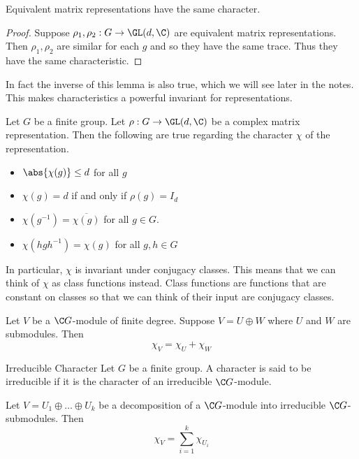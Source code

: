 \documentclass[a4paper]{article}
\begin{document}
\begin{lmm}{}{} Equivalent matrix representations have the same character. \tcbline
\begin{proof}
Suppose $\rho_1,\rho_2:G\to\GL(d,\C)$ are equivalent matrix representations. Then $\rho_1,\rho_2$ are similar for each $g$ and so they have the same trace. Thus they have the same characteristic. 
\end{proof}
\end{lmm}

In fact the inverse of this lemma is also true, which we will see later in the notes. This makes characteristics a powerful invariant for representations. 

\begin{prp}{}{} Let $G$ be a finite group. Let $\rho:G\to\GL(d,\C)$ be a complex matrix representation. Then the following are true regarding the character $\chi$ of the representation. 
\begin{itemize}
\item $\abs{\chi(g)}\leq d$ for all $g$
\item $\chi(g)=d$ if and only if $\rho(g)=I_d$
\item $\chi(g^{-1})=\overline{\chi(g)}$ for all $g\in G$. 
\item $\chi(hgh^{-1})=\chi(g)$ for all $g,h\in G$
\end{itemize}
\end{prp}

In particular, $\chi$ is invariant under conjugacy classes. This means that we can think of $\chi$ as class functions instead. Class functions are functions that are constant on classes so that we can think of their input are conjugacy classes. 

\begin{lmm}{}{} Let $V$ be a $\C G$-module of finite degree. Suppose $V=U\oplus W$ where $U$ and $W$ are submodules. Then $$\chi_V=\chi_U+\chi_W$$
\end{lmm}

\begin{defn}{Irreducible Character}{} Let $G$ be a finite group. A character is said to be irreducible if it is the character of an irreducible $\C G$-module. 
\end{defn}

\begin{lmm}{}{} Let $V=U_1\oplus\dots\oplus U_k$ be a decomposition of a $\C G$-module into irreducible $\C G$-submodules. Then $$\chi_V=\sum_{i=1}^k\chi_{U_i}$$
\end{lmm}
\end{document}
